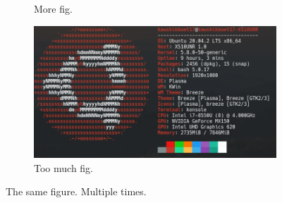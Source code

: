 \documentclass[14pt, a4paper]{article} %
\begin{document}
\begin{figure}[h!]
\begin{subfigure}[b]{0.2\linewidth}
                \caption{More fig.}
            \end{subfigure}
            \begin{subfigure}[b]{0.5\linewidth}
                \includegraphics[width=\linewidth]{figure1.jpg}
                \caption{Too much fig.}
            \end{subfigure}
            \caption{The same figure. Multiple times.}
            \label{fig:coffee3}
        \end{figure}
\end{document}

